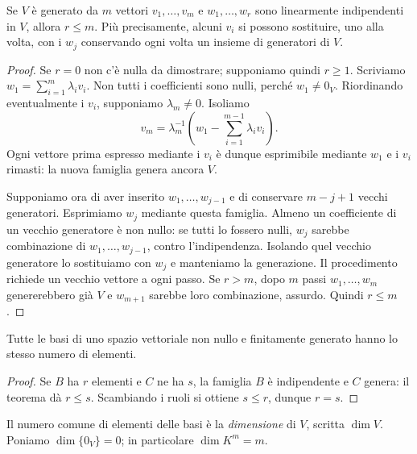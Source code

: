 \begin{teorema}
Se $V$ è generato da $m$ vettori $v_1,\ldots,v_m$ e
$w_1,\ldots,w_r$ sono linearmente indipendenti in $V$, allora
$r\leq m$. Più precisamente, alcuni $v_i$ si possono sostituire,
uno alla volta, con i $w_j$ conservando ogni volta un insieme di
generatori di $V$.
\end{teorema}
\begin{proof}
Se $r=0$ non c'è nulla da dimostrare; supponiamo quindi $r\geq1$.
Scriviamo $w_1=\sum_{i=1}^m\lambda_i v_i$. Non tutti i coefficienti
sono nulli, perché $w_1\ne0_V$. Riordinando eventualmente i $v_i$,
supponiamo $\lambda_m\ne0$. Isoliamo
\[
v_m=\lambda_m^{-1}\left(w_1-\sum_{i=1}^{m-1}\lambda_i v_i\right).
\]
Ogni vettore prima espresso mediante i $v_i$ è dunque
esprimibile mediante $w_1$ e i $v_i$ rimasti: la nuova famiglia
genera ancora $V$.

Supponiamo ora di aver inserito $w_1,\ldots,w_{j-1}$ e di conservare
$m-j+1$ vecchi generatori. Esprimiamo $w_j$ mediante questa famiglia.
Almeno un coefficiente di un vecchio generatore è non nullo: se tutti
lo fossero nulli, $w_j$ sarebbe combinazione di
$w_1,\ldots,w_{j-1}$, contro l'indipendenza. Isolando quel vecchio
generatore lo sostituiamo con $w_j$ e manteniamo la generazione.
Il procedimento richiede un vecchio vettore a ogni passo. Se
$r>m$, dopo $m$ passi $w_1,\ldots,w_m$ genererebbero già $V$ e
$w_{m+1}$ sarebbe loro combinazione, assurdo. Quindi $r\leq m$.
\end{proof}

\begin{corollario}
Tutte le basi di uno spazio vettoriale non nullo e finitamente
generato hanno lo stesso numero di elementi.
\end{corollario}
\begin{proof}
Se $B$ ha $r$ elementi e $C$ ne ha $s$, la famiglia $B$ è
indipendente e $C$ genera: il teorema dà $r\leq s$. Scambiando i
ruoli si ottiene $s\leq r$, dunque $r=s$.
\end{proof}
\begin{definizione}
Il numero comune di elementi delle basi è la \emph{dimensione} di $V$,
scritta $\dim V$. Poniamo $\dim\{0_V\}=0$; in particolare
$\dim K^m=m$.
\end{definizione}

